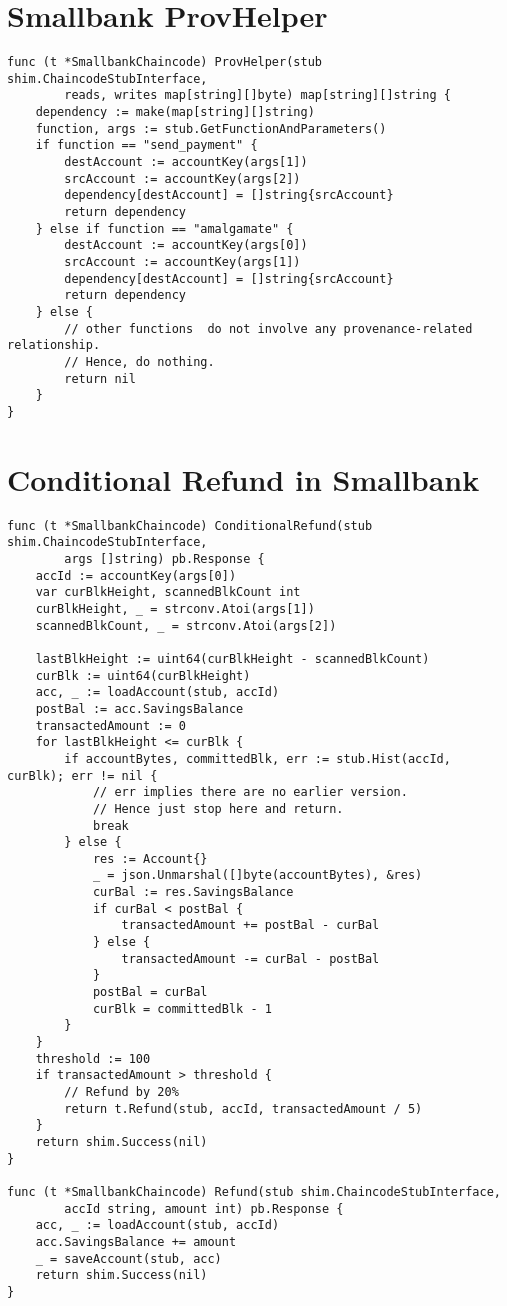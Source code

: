 \section{Smallbank ProvHelper}
\label{sec:append:contracts:smallbank_prov}
\begin{lstlisting}
func (t *SmallbankChaincode) ProvHelper(stub shim.ChaincodeStubInterface, 
        reads, writes map[string][]byte) map[string][]string {
	dependency := make(map[string][]string)
	function, args := stub.GetFunctionAndParameters()
	if function == "send_payment" {
		destAccount := accountKey(args[1])
		srcAccount := accountKey(args[2])
		dependency[destAccount] = []string{srcAccount}
		return dependency
	} else if function == "amalgamate" {
		destAccount := accountKey(args[0])
		srcAccount := accountKey(args[1])
		dependency[destAccount] = []string{srcAccount}
		return dependency
	} else {
		// other functions  do not involve any provenance-related relationship.
		// Hence, do nothing.
		return nil
    }
}
\end{lstlisting}

\section{Conditional Refund in Smallbank}
\label{sec:append:contracts:cond_refund}
\begin{lstlisting}
func (t *SmallbankChaincode) ConditionalRefund(stub shim.ChaincodeStubInterface, 
        args []string) pb.Response {
	accId := accountKey(args[0])
	var curBlkHeight, scannedBlkCount int
	curBlkHeight, _ = strconv.Atoi(args[1])
	scannedBlkCount, _ = strconv.Atoi(args[2])

	lastBlkHeight := uint64(curBlkHeight - scannedBlkCount)
	curBlk := uint64(curBlkHeight)
	acc, _ := loadAccount(stub, accId)
	postBal := acc.SavingsBalance
	transactedAmount := 0
	for lastBlkHeight <= curBlk {
		if accountBytes, committedBlk, err := stub.Hist(accId, curBlk); err != nil {
            // err implies there are no earlier version. 
            // Hence just stop here and return.
			break
		} else {
			res := Account{}
			_ = json.Unmarshal([]byte(accountBytes), &res)
			curBal := res.SavingsBalance
			if curBal < postBal {
				transactedAmount += postBal - curBal 
			} else {
				transactedAmount -= curBal - postBal
			}
			postBal = curBal
			curBlk = committedBlk - 1
		}
	}
	threshold := 100
	if transactedAmount > threshold {
		// Refund by 20%
		return t.Refund(stub, accId, transactedAmount / 5) 
	}
	return shim.Success(nil)
}

func (t *SmallbankChaincode) Refund(stub shim.ChaincodeStubInterface, 
        accId string, amount int) pb.Response {
	acc, _ := loadAccount(stub, accId)
	acc.SavingsBalance += amount
	_ = saveAccount(stub, acc)
	return shim.Success(nil)
}
\end{lstlisting}

